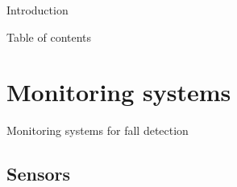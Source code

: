 \begin{frame}{Introduction}
\begin{minipage}[t]{0.47\linewidth}
\end{minipage}
\end{frame}

\endgroup

\begingroup
{}
\setcounter{tocdepth}{1}
\begin{frame}[noframenumbering]{Table of contents}
    \centering
    \large
    \tableofcontents
\end{frame}
\endgroup

\section{Monitoring systems}

\begingroup
{}  %
\begin{frame}[noframenumbering]{}
    \centering
    \vspace{3cm}
    \Huge
    \textcolor{myblue}{Monitoring systems for fall detection}
\end{frame}
\endgroup


\subsection{Sensors}

